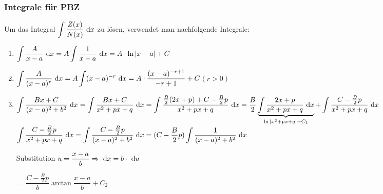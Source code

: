 \subsubsection{Integrale für PBZ}
Um das Integral $\displaystyle\int\dfrac{Z(x)}{N(x)}\ \mathrm{d}x$ zu lösen, verwendet man nachfolgende Integrale:
\begin{enumerate}
	\item $\displaystyle\int\dfrac{A}{x-a}\ \mathrm{d}x=A\displaystyle\int\dfrac{1}{x-a}\ \mathrm{d}x=A\cdot\ln|x-a|+C$
	\item $\displaystyle\int\dfrac{A}{(x-a)^r}\ \mathrm{d}x=A\displaystyle\int(x-a)^{-r}\ \mathrm{d}x=A\cdot\dfrac{(x-a)^{-r+1}}{-r+1}+C$\quad$(r>0)$
	\item $\displaystyle\int\dfrac{Bx+C}{(x-a)^2+b^2}\ \mathrm{d}x=\displaystyle\int\dfrac{Bx+C}{x^2+px+q}\ \mathrm{d}x=\displaystyle\int\dfrac{\frac{B}{2}(2x+p)+C-\frac{B}{2}p}{x^2+px+q}\ \mathrm{d}x\\
	=\dfrac{B}{2}\underbrace{\displaystyle\int\dfrac{2x+p}{x^2+px+q}\ \mathrm{d}x}_{\ln|x^2+px+q|+C_1}+\displaystyle\int\dfrac{C-\frac{B}{2}p}{x^2+px+q}\ \mathrm{d}x$\\
	$\displaystyle\int\dfrac{C-\frac{B}{2}p}{x^2+px+q}\ \mathrm{d}x=\displaystyle\int\dfrac{C-\frac{B}{2}p}{(x-a)^2+b^2}\ \mathrm{d}x=(C-\dfrac{B}{2}p)\displaystyle\int\dfrac{1}{(x-a)^2+b^2}\ \mathrm{d}x$
	
	Substitution $u=\dfrac{x-a}{b}\Rightarrow\ \mathrm{d}x=b\cdot\ \mathrm{d}u$
	
	$=\dfrac{C-\frac{B}{2}p}{b}\arctan\dfrac{x-a}{b}+C_2$
\end{enumerate}

